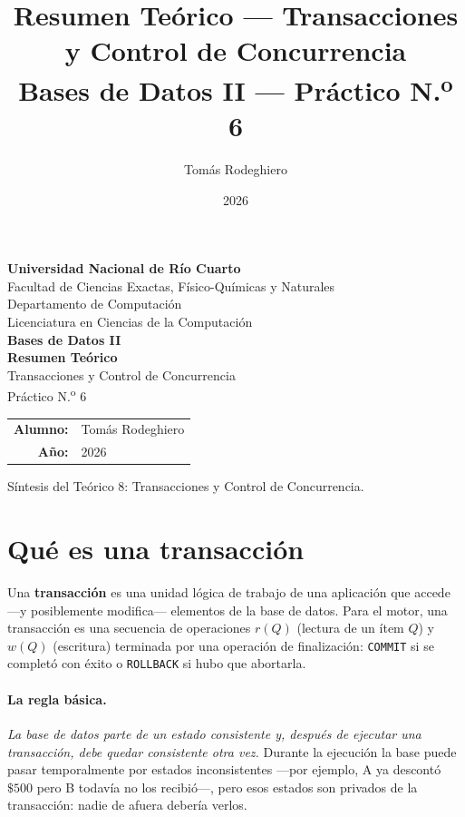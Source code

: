 \documentclass[11pt,a4paper]{article}
\title{Resumen Teórico --- Transacciones y Control de Concurrencia\\[4pt]
       \large Bases de Datos II --- Práctico N.\textsuperscript{o} 6}
\author{Tomás Rodeghiero}
\date{2026}
\begin{document}
\begin{titlepage}
    \centering
    \vspace*{1.5cm}

    {\large \textbf{Universidad Nacional de Río Cuarto}}\\[6pt]
    {\normalsize Facultad de Ciencias Exactas, Físico-Químicas y Naturales}\\[4pt]
    {\normalsize Departamento de Computación}\\[4pt]
    {\normalsize Licenciatura en Ciencias de la Computación}\\[3cm]

    {\Large \textbf{Bases de Datos II}}\\[1.2cm]

    {\Large \textbf{Resumen Teórico}}\\[6pt]
    {\large Transacciones y Control de Concurrencia\\[2pt]
    Práctico N.\textsuperscript{o} 6}\\[3cm]

    \begin{tabular}{rl}
        \textbf{Alumno:} & Tomás Rodeghiero \\[4pt]
        \textbf{Año:}    & 2026 \\
    \end{tabular}

    \vfill
    {\small Síntesis del Teórico 8: Transacciones y Control de Concurrencia.}
\end{titlepage}

\tableofcontents
\newpage

\section{Qué es una transacción}

Una \textbf{transacción} es una unidad lógica de trabajo de una aplicación
que accede ---y posiblemente modifica--- elementos de la base de datos.
Para el motor, una transacción es una secuencia de operaciones
$r(Q)$ (lectura de un ítem $Q$) y $w(Q)$ (escritura) terminada por una
operación de finalización: \texttt{COMMIT} si se completó con éxito o
\texttt{ROLLBACK} si hubo que abortarla.

\paragraph{La regla básica.}
\emph{La base de datos parte de un estado consistente y, después de
ejecutar una transacción, debe quedar consistente otra vez.} Durante la
ejecución la base puede pasar temporalmente por estados inconsistentes
---por ejemplo, A ya descontó $\$500$ pero B todavía no los recibió---,
pero esos estados son privados de la transacción: nadie de afuera debería
verlos.
\end{document}
